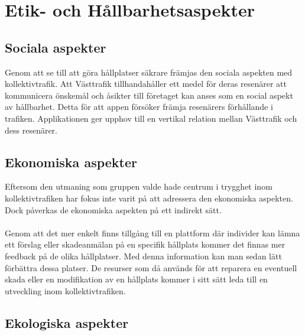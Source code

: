 \documentclass{article}
\begin{document}
\section*{Etik- och Hållbarhetsaspekter}
\subsection*{Sociala aspekter}
Genom att se till att göra hållplatser säkrare främjas den sociala aspekten med kollektivtrafik. Att Västtrafik tillhandahåller ett medel för deras resenärer att kommunicera önskemål och åsikter till företaget kan anses som en social aspekt av hållbarhet. Detta för att appen försöker främja resenärers förhållande i trafiken. Applikationen ger upphov till en vertikal relation mellan Västtrafik och dess resenärer.

\subsection*{Ekonomiska aspekter}
Eftersom den utmaning som gruppen valde hade centrum i trygghet inom kollektivtrafiken har fokus inte varit på att adressera den ekonomiska aspekten. Dock påverkas de ekonomiska aspekten på ett indirekt sätt. 
\\\\
Genom att det mer enkelt finns tillgång till en plattform där individer kan lämna ett förslag eller skadeanmälan på en specifik hållplats kommer det finnas mer feedback på de olika hållplatser. Med denna information kan man sedan lätt förbättra dessa platser. De resurser som då används för att reparera en eventuell skada eller en modifikation av en hållplats kommer i sitt sätt leda till en utveckling inom kollektivtrafiken.
\subsection*{Ekologiska aspekter}
\end{document}
